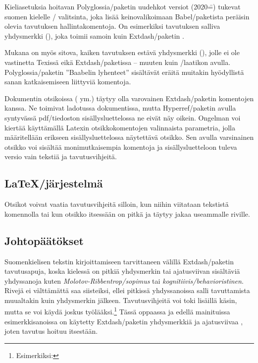 Kieli\-asetuksia hoitavan Polyglossia\-/paketin uudehkot versiot
(2020\==) tukevat suomen kielelle \-/ valitsinta,
joka lisää keinovalikoimaan Babel\-/paketista peräisin olevia tavutuksen
hallintakomentoja. On esimerkiksi tavutuksen salliva yhdysmerkki
(\koodi{\textquotedbl-}), joka toimii samoin kuin Extdash\-/paketin
\koodi{\keno -/}.

Mukana on myös sitova, kaiken tavutuksen estävä yhdysmerkki
(\koodi{\textquotedbl\textasciitilde}), jolle ei ole vastinetta Texissä
eikä Extdash\-/paketissa -- muuten kuin \-/laatikon
avulla. Polyglossia\-/paketin ''Baabelin lyhenteet'' sisältävät eräitä
muitakin hyödyllistä sanan katkaisemiseen liittyviä komentoja.

Dokumentin otsikoissa ( ym.) täytyy olla varovainen
Extdash\-/paketin komentojen kanssa. Ne toimivat ladotussa dokumentissa,
mutta Hyperref\-/paketin avulla syntyvässä pdf\-/tiedoston
sisällysluettelossa ne eivät näy oikein. Ongelman voi kiertää
käyttämällä Latexin otsikkokomentojen valinnaista parametria, jolla
määritellään erikseen sisällysluettelossa näytettävä otsikko. Sen avulla
varsinainen otsikko voi sisältää monimutkaisempia komentoja ja
sisällysluetteloon tuleva versio vain tekstiä ja tavutusvihjeitä.

\begin{koodilohkosis}
  \section[Latex-jär\-jes\-tel\-mä]{\LaTeX\-/järjestelmä}
\end{koodilohkosis}

Otsikot voivat vaatia tavutusvihjeitä silloin, kun niihin viitataan
tekstistä komennolla  tai kun otsikko itsessään on
pitkä ja täytyy jakaa useammalle riville.

\subsection{Johtopäätökset}

Suomenkielisen tekstin kirjoittamiseen tarvittaneen välillä
Extdash\-/paketin tavutus\-apuja, koska kielessä on pitkiä yhdysmerkin
tai ajatusviivan sisältäviä yhdyssanoja kuten
\emph{Molotov\--Ribben\-trop\-/sopimus} tai
\emph{kognitiivis\-/behavioristinen}. Rivejä ei välttämättä saa
siisteiksi, ellei pitkissä yhdyssanoissa salli tavuttamista muualtakin
kuin yhdysmerkin jälkeen. Tavutusvihjeitä voi toki lisäillä käsin, mutta
se voi käydä joskus työlääksi.\footnote{Esimerkiksi:
  } Tässä oppaassa ja
edellä mainituissa esimerkkisanoissa on käytetty Extdash\-/paketin
yhdysmerkkiä \koodi{\keno -/} ja ajatusviivaa \koodi{\keno --}, joten
tavutus hoituu itsestään.

